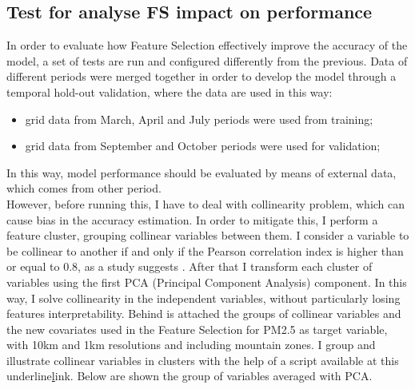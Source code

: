 \subsection{Test for analyse FS impact on performance}
In order to evaluate how Feature Selection effectively improve the accuracy of the model, a set of tests are run and configured differently from the previous. 
Data of different periods were merged together in order to develop the model through a temporal hold-out validation, where the data are used in this way:
\begin{itemize}
    \item grid data from March, April and July periods were used from training;
    \item grid data from September and October periods were used for validation;
\end{itemize}
In this way, model performance should be evaluated by means of external data, which comes from other period.\\
However, before running this, I have to deal with collinearity problem, which can cause bias in the accuracy estimation. In order to mitigate this, I perform a feature cluster, grouping collinear variables between them. I consider a variable to be collinear to another if and only if the Pearson correlation index is higher than or equal to 0.8, as a study suggests \cite{shrestha2020detecting}. After that I transform each cluster of variables using the first PCA (Principal Component Analysis)  component. In this way, I solve collinearity in the independent variables, without particularly losing features interpretability.
Behind is attached the groups of collinear variables and the new covariates used in the Feature Selection for PM2.5 as target variable, with 10km and 1km resolutions and including mountain zones.
I group and illustrate collinear variables in clusters with the help of a script available at this underline{\href{https://www.kaggle.com/code/nassehkhodaie/fixing-multicollinearity-by-feature-clustering/data?select=collinearity_finder_treater_py.py} link}.
Below are shown the group of variables averaged with PCA.
